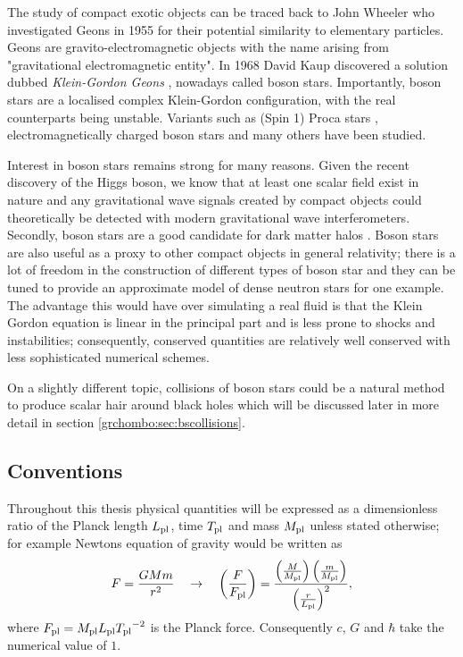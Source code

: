 The study of compact exotic objects can be traced back to John Wheeler who investigated Geons in 1955 for their potential similarity to elementary particles. Geons are gravito-electromagnetic objects with the name arising from "gravitational electromagnetic entity". In 1968 David Kaup discovered a solution dubbed {\it Klein-Gordon Geons} \cite{Kaup:1968zz}, nowadays called boson stars. Importantly, boson stars are a localised complex Klein-Gordon configuration, with the real counterparts being unstable. Variants such as (Spin 1) Proca stars \cite{brito2016proca}, electromagnetically charged boson stars and many others have been studied.

Interest in boson stars remains strong for many reasons. Given the recent discovery
of the Higgs boson, we know that at least one scalar field exist in nature and any
gravitational wave signals created by compact objects could theoretically be detected
with modern gravitational wave interferometers. Secondly, boson stars are a good
candidate for dark matter halos \cite{lee1996galactic} \cite{schunck2003general}.
Boson stars are also useful as a proxy to other compact objects in general relativity;
there is a lot of freedom in the construction of different types of boson star
and they can be tuned to provide an approximate model of dense neutron stars for
one example. The advantage this would have over simulating a real fluid is that
the Klein Gordon equation is linear in the principal part \color{orchid} and
is less prone to shocks and instabilities; consequently, conserved
quantities are relatively well conserved with less sophisticated numerical schemes. \color{black}

On a slightly different topic, collisions of boson stars could be a natural method
to produce scalar hair around black holes which will be discussed later in more
detail in section \ref{grchombo:sec:bscollisions}.

\subsection{Conventions} \label{intro:sec:conventions}
Throughout this thesis physical quantities will be expressed as a dimensionless ratio of the Planck length ${L_{\rm pl}}$, time ${T_{\rm pl}}$ and mass ${M_{\rm pl}}$ unless stated otherwise; for example Newtons equation of gravity would be written as
\begin{equation}
F=\frac{GMm}{r^2} \quad \rightarrow \quad\left(\frac{F}{{F_{\rm pl}}}\right) = \frac{\left(\frac{M}{{M_{\rm pl}}}\right)  \left(\frac{m}{{M_{\rm pl}}}\right)}{\left(\frac{r}{{L_{\rm pl}}}\right)^2},
\end{equation}
where ${F_{\rm pl}} = {M_{\rm pl}}{L_{\rm pl}}{T_{\rm pl}}^{-2}$ is the Planck force. Consequently $c$, $G$ and $\hbar$ take the numerical value of $1$.

